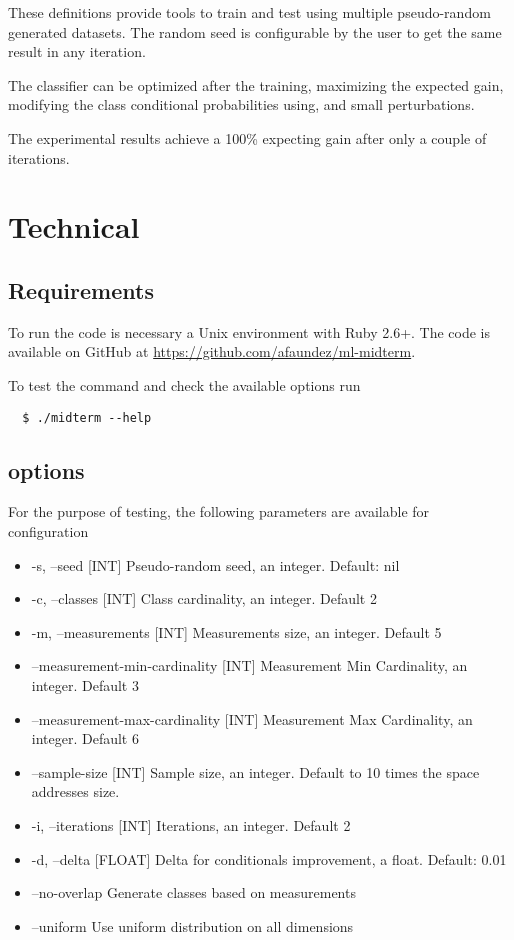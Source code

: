 \documentclass[letterpaper, conference]{IEEEtran}
\begin{document}
These definitions provide tools to train and test using multiple pseudo-random generated datasets. The random seed is configurable by the user to get the same result in any iteration.

The classifier can be optimized after the training, maximizing the expected gain, modifying the class conditional probabilities using, and small perturbations.

The experimental results achieve a 100\% expecting gain after only a couple of iterations.

\section{Technical}

\subsection{Requirements}

To run the code is necessary a Unix environment with Ruby 2.6+. The code is available on GitHub at \url{https://github.com/afaundez/ml-midterm}.

To test the command and check the available options run

\begin{verbatim}
  $ ./midterm --help
\end{verbatim}

\subsection{options}

For the purpose of testing, the following parameters are available for configuration

\begin{itemize}
    \item-s, --seed [INT]                 Pseudo-random seed, an integer. Default: nil
    \item-c, --classes [INT]              Class cardinality, an integer. Default 2
    \item-m, --measurements [INT]         Measurements size, an integer. Default 5
    \item    --measurement-min-cardinality [INT]
                                     Measurement Min Cardinality, an integer. Default 3
    \item    --measurement-max-cardinality [INT]
                                     Measurement Max Cardinality, an integer. Default 6
    \item    --sample-size [INT]          Sample size, an integer. Default to 10 times the  space addresses size.
    \item-i, --iterations [INT]           Iterations, an integer. Default 2
    \item-d, --delta [FLOAT]              Delta for conditionals improvement, a float. Default: 0.01
    \item    --no-overlap                 Generate classes based on measurements
    \item    --uniform                    Use uniform distribution on all dimensions
\end{itemize}
\end{document}
